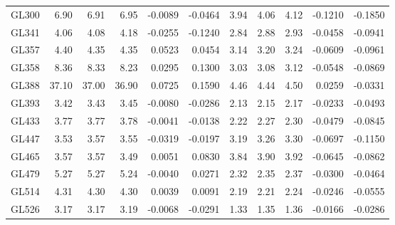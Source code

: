 \begin{longtable}{|l||r|r|r|r|r||r|r|r|r|r|}
GL300 & 6.90 & 6.91 & 6.95 & -0.0089 & -0.0464 & 3.94 & 4.06 & 4.12 & -0.1210 & -0.1850\\   
GL341 & 4.06 & 4.08 & 4.18 & -0.0255 & -0.1240 & 2.84 & 2.88 & 2.93 & -0.0458 & -0.0941\\  
GL357 & 4.40 & 4.35 & 4.35 & 0.0523 & 0.0454 & 3.14 & 3.20 & 3.24 & -0.0609 & -0.0961\\     
GL358 & 8.36 & 8.33 & 8.23 & 0.0295 & 0.1300 & 3.03 & 3.08 & 3.12 & -0.0548 & -0.0869\\     
GL388 & 37.10 & 37.00 & 36.90 & 0.0725 & 0.1590 & 4.46 & 4.44 & 4.50 & 0.0259 & -0.0331\\        
GL393 & 3.42 & 3.43 & 3.45 & -0.0080 & -0.0286 & 2.13 & 2.15 & 2.17 & -0.0233 & -0.0493\\
GL433 & 3.77 & 3.77 & 3.78 & -0.0041 & -0.0138 & 2.22 & 2.27 & 2.30 & -0.0479 & -0.0845\\ 
GL447 & 3.53 & 3.57 & 3.55 & -0.0319 & -0.0197 & 3.19 & 3.26 & 3.30 & -0.0697 & -0.1150\\   
GL465 & 3.57 & 3.57 & 3.49 & 0.0051 & 0.0830 & 3.84 & 3.90 & 3.92 & -0.0645 & -0.0862\\    
GL479 & 5.27 & 5.27 & 5.24 & -0.0040 & 0.0271 & 2.32 & 2.35 & 2.37 & -0.0300 & -0.0464\\   
GL514 & 4.31 & 4.30 & 4.30 & 0.0039 & 0.0091 & 2.19 & 2.21 & 2.24 & -0.0246 & -0.0555\\   
GL526 & 3.17 & 3.17 & 3.19 & -0.0068 & -0.0291 & 1.33 & 1.35 & 1.36 & -0.0166 & -0.0286\\

\end{longtable}
